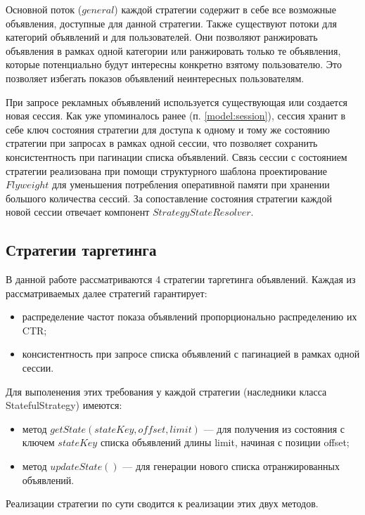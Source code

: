 \documentclass[specification,annotation,times]{itmo-student-thesis}
\begin{document}


Основной поток ($general$) каждой стратегии содержит в себе все возможные объявления, доступные для данной стратегии. Также существуют потоки для категорий объявлений и для пользователей. Они позволяют ранжировать объявления в рамках одной категории или ранжировать только те объявления, которые потенциально будут интересны конкретно взятому пользователю. Это позволяет избегать показов объявлений неинтересных пользователям.

При запросе рекламных объявлений используется существующая или создается новая сессия. Как уже упоминалось ранее (п. \ref{model:session}), сессия хранит в себе ключ состояния стратегии для доступа к одному и тому же состоянию стратегии при запросах в рамках одной сессии, что позволяет сохранить консистентность при пагинации списка объявлений. Связь сессии с состоянием стратегии реализована при помощи структурного шаблона проектирование $Flyweight$ для уменьшения потребления оперативной памяти при хранении большого количества сессий. За сопоставление состояния стратегии каждой новой сессии отвечает компонент $StrategyStateResolver$. 


\subsection{Стратегии таргетинга}\label{sec:strategies}

В данной работе рассматриваются 4 стратегии таргетинга объявлений.
Каждая из рассматриваемых далее стратегий гарантирует:
\begin{itemize}
\item распределение частот показа объявлений пропорционально распределению их CTR;
\item консистентность при запросе списка объявлений с пагинацией в рамках одной сессии.
\end{itemize}

Для выполенения этих требования у каждой стратегии (наследники класса StatefulStrategy) имеются:
\begin{itemize}
\item метод $getState(stateKey, offset, limit)$ — для получения из состояния с ключем $stateKey$ списка объявлений длины limit, начиная с позиции offset;
\item метод $updateState()$ — для генерации нового списка отранжированных объявлений.
\end{itemize}
Реализации стратегии по сути сводится к реализации этих двух методов.
\end{document}
